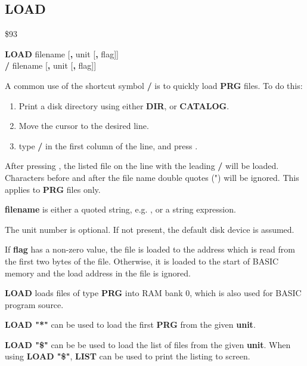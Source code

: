 
\newpage
\subsection{LOAD}
\begin{description}[leftmargin=2cm,style=nextline]
\item [Token:] \$93
\item [Format:] {\bf LOAD} filename [{\bf,} unit [{\bf,} flag]] \\
                {\bf /} filename [{\bf,} unit [{\bf,} flag]]
\item [Usage:]

   A common use of the shortcut symbol {\bf /} is to quickly load
   {\bf PRG} files. To do this:

    \begin{enumerate}
    \item Print a disk directory using either {\bf DIR}, or {\bf CATALOG}.
    \item Move the cursor to the desired line.
    \item type {\bf /} in the first column of the line, and press .
    \end{enumerate}
   After pressing , the listed file on the line with the leading {\bf /} will be loaded.
Characters before and after the file name double quotes (") will be ignored.
   This applies to {\bf PRG} files only.

   {\bf filename} is either a quoted string, e.g. , or
   a string expression.

   The unit number is optional.
   If not present, the default disk device is assumed.

   If {\bf flag} has a non-zero value, the file is loaded to
   the address which is read from the first two bytes of the file.
   Otherwise, it is loaded to the start of BASIC memory and
   the load address in the file is ignored.

\item [Remarks:]
   {\bf LOAD} loads files of type {\bf PRG} into RAM bank 0,
   which is also used for BASIC program source.

   {\bf LOAD "*"} can be used to load the first {\bf PRG} from the
   given {\bf unit}.

   {\bf LOAD "\$"} can be be used to load
   the list of files from the given {\bf unit}. When using {\bf LOAD "\$"},
   {\bf LIST} can be used to print the listing to screen.


\end{description}
